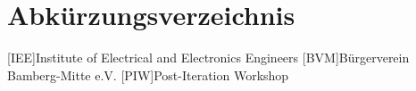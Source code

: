 \chapter*{Abkürzungsverzeichnis}

\begin{acronym}
    [IEE]{Institute of Electrical and Electronics Engineers}
    [BVM]{Bürgerverein Bamberg-Mitte e.V.}
    [PIW]{Post-Iteration Workshop}
\end{acronym}